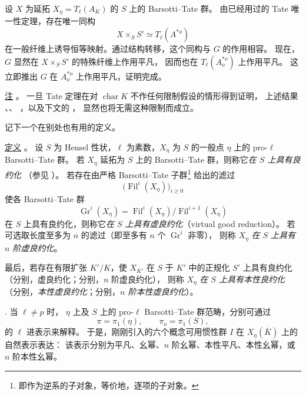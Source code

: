 设 $X$ 为延拓 $X_\eta=T_\ell(A_K)$ 的 $S$ 上的 Barsotti--Tate 群。
由已经用过的 Tate 唯一性定理，存在唯一同构
\[
 X\times_S S'\simeq T_\ell(A^{*o})
\]
在一般纤维上诱导恒等映射。通过结构转移，这个同构与 $G$ 的作用相容。
现在，$G$ 显然在 $X\times_S S'$ 的特殊纤维上作用平凡，
因而也在 $T_\ell(A_o^{*o})$ 上作用平凡。
这立即推出 $G$ 在 $A_o^{*o}$ 上作用平凡，证明完成。


\medskip
\noindent
\underline{注} 。
一旦 Tate 定理在对 $\operatorname{char}K$ 不作任何限制假设的情形得到证明，
上述结果 、、
，以及下文的 ，
显然也将无需这种限制而成立。

记下一个在别处也有用的定义。

\medskip
\noindent
\underline{定义} 。
设 $S$ 为 Hensel 性状，$\ell$ 为素数，$X_\eta$ 为 $S$ 的一般点 $\eta$ 上的 pro-$\ell$ Barsotti--Tate 群。
若 $X_\eta$ 延拓为 $S$ 上的 Barsotti--Tate 群，则称它\emph{在 $S$ 上具有良约化}
（参见 ）。
若存在由严格 Barsotti--Tate 子群\footnote{即作为逆系的子对象，等价地，逐项的子对象。}
给出的滤过
\[
 \bigl(\operatorname{Fil}^i(X_\eta)\bigr)_{i\geq0}
\]
使各 Barsotti--Tate 群
\[
 \operatorname{Gr}^i(X_\eta)=
 \operatorname{Fil}^i(X_\eta)/\operatorname{Fil}^{i+1}(X_\eta)
\]
在 $S$ 上具有良约化，则称它\emph{在 $S$ 上具有虚良约化}（virtual good reduction）。
若可选取长度至多为 $n$ 的滤过（即至多有 $n$ 个 $\operatorname{Gr}^i$ 非零），
则称 $X_\eta$ \emph{在 $S$ 上具有 $n$ 阶虚良约化}。

最后，若存在有限扩张 $K'/K$，使 $X_{K'}$ 在 $S$ 于 $K'$ 中的正规化 $S'$ 上具有良约化
（分别，虚良约化；分别，$n$ 阶虚良约化），
则称 $X_\eta$ \emph{在 $S$ 上具有本性良约化}
（分别，\emph{本性虚良约化}；分别，\emph{$n$ 阶本性虚良约化}）。

\medskip
\noindent
{}. 当 $\ell\neq p$ 时，
$\eta$ 上及 $S$ 上的 pro-$\ell$ Barsotti--Tate 群范畴，分别可通过
\[
 \pi=\pi_1(\eta), \qquad \pi_o=\pi_1(S),
\]
的 $\ell$ 进表示来解释。
于是，刚刚引入的六个概念可用惯性群 $I$ 在 $X_\eta(\overline K)$ 上的自然表示表达：
该表示分别为平凡、幺幂、$n$ 阶幺幂、本性平凡、本性幺幂，或 $n$ 阶本性幺幂。

